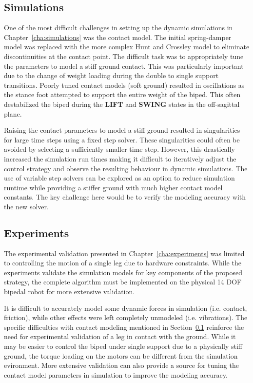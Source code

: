 \subsection{Simulations} %
\label{sub:simulations}
One of the most difficult challenges in setting up the dynamic simulations in Chapter~\ref{cha:simulations} was the contact model. The initial spring-damper model was replaced with the more complex Hunt and Crossley model to eliminate discontinuities at the contact point. The difficult task was to appropriately tune the parameters to model a stiff ground contact. This was particularly important due to the change of weight loading during the double to single support transitions. Poorly tuned contact models (soft ground) resulted in oscillations as the stance foot attempted to support the entire weight of the biped. This often destabilized the biped during the \textbf{LIFT} and \textbf{SWING} states in the off-sagittal plane. 

Raising the contact parameters to model a stiff ground resulted in singularities for large time steps using a fixed step solver. These singularities could often be avoided by selecting a sufficiently smaller time step. However, this drastically increased the simulation run times making it difficult to iteratively adjust the control strategy and observe the resulting behaviour in dynamic simulations. The use of variable step solvers can be explored as an option to reduce simulation runtime while providing a stiffer ground with much higher contact model constants. The key challenge here would be to verify the modeling accuracy with the new solver. 

\subsection{Experiments} %
\label{sub:experiments}
The experimental validation presented in Chapter~\ref{cha:experiments} was limited to controlling the motion of a single leg due to hardware constraints. While the experiments validate the simulation models for key components of the proposed strategy, the complete algorithm must be implemented on the physical 14 DOF bipedal robot for more extensive validation. 

It is difficult to accurately model some dynamic forces in simulation (i.e. contact, friction), while other effects were left completely unmodeled (i.e. vibrations). The specific difficulties with contact modeling mentioned in Section~\ref{sub:simulations} reinforce the need for experimental validation of a leg in contact with the ground. While it may be easier to control the biped under single support due to a physically stiff ground, the torque loading on the motors can be different from the simulation evironment. More extensive validation can also provide a source for tuning the contact model parameters in simulation to improve the modeling accuracy. 

